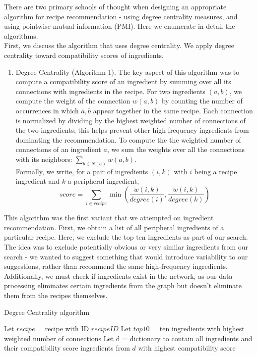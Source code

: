 \documentclass{acm_proc_article-sp}
\begin{document}
There are two primary schools of thought when designing an appropriate algorithm for recipe recommendation - using degree centrality measures, and using pointwise mutual information (PMI). Here we enumerate in detail the algorithms. \\
First, we discuss the algorithm that uses degree centrality. We apply degree centrality toward compatibility scores of ingredients.

\begin{enumerate}
	\item Degree Centrality (Algorithm 1). 
	The key aspect of this algorithm was to compute a compatibility score 
	of an ingredient by summing over all its connections with ingredients in the recipe. 
	For two ingredients $(a,b)$, we compute the weight of the connection $w(a,b)$ by 
	counting the number of occurrences in which $a,b$ appear together in the same recipe. 
	Each connection is normalized by dividing by the highest weighted number of connections of 
	the two ingredients; this helps prevent other high-frequency ingredients from
	dominating the recommendation. To compute the the weighted number of connections of 
	an ingredient $a$, we sum the weights over all the connections with its neighbors: $\sum_{b \in N(a)} w(a,b)$.
	\\
	 Formally, we write, for a pair of ingredients $(i, k)$
	with $i$ being a recipe ingredient and $k$ a peripheral ingredient,
	\[score = \sum_{i \in recipe} \min(\frac{w(i,k)}{degree(i)},\frac{w(i,k)}{degree(k)})
	\]

\end{enumerate}

This algorithm was the first variant that we attempted on ingredient recommendation. First, we obtain a list of 
	all peripheral ingredients of a particular recipe. 
	 Here, we exclude the top ten ingredients
	as part of our search. The idea was to exclude potentially obvious or very
	similar ingredients from our search - we wanted to suggest something that would 
	introduce variability to our suggestions, rather than recommend the same
	high-frequency ingredients. Additionally, we must check if ingredients
	exist in the network, as our data processing eliminates certain ingredients
	from the graph but doesn't eliminate them from the recipes themselves.

\begin{algorithm}
\caption{Degree Centrality algorithm}
\begin{algorithmic}[1]
  	\State Let $recipe$ = recipe with ID $recipeID$
    \State Let $top10$ = ten ingredients with highest weighted number of connections
    \State Let d = dictionary to contain all ingredients and their compatibility score
    		\EndFor
    	\EndIf
    \EndFor
     ingredients from $d$ with highest compatibility score
   \EndFunction

\end{algorithmic}
\end{algorithm}
\end{document}
